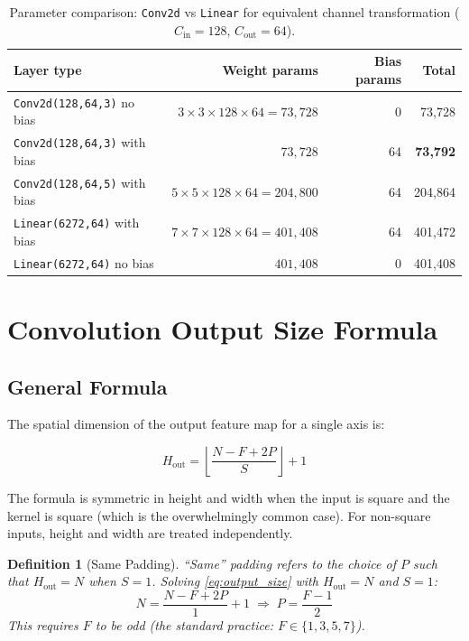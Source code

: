 \documentclass[12pt,a4paper]{article}
\newtheorem{definition}{Definition}[section]
\newcommand{\Cin}{C_{\mathrm{in}}}
\newcommand{\Cout}{C_{\mathrm{out}}}
\newcommand{\floor}[1]{\left\lfloor #1 \right\rfloor}
\begin{document}
\begin{table}[ht]
  \centering
  \caption{Parameter comparison: \texttt{Conv2d} vs \texttt{Linear} for
    equivalent channel transformation ($\Cin=128$, $\Cout=64$).}
  \label{tab:param_comparison}
  \begin{tabularx}{\linewidth}{@{}Xrrr@{}}
    \toprule
    Layer type & Weight params & Bias params & \textbf{Total} \\
    \midrule
    \texttt{Conv2d(128,64,3)} no bias
      & $3\!\times\!3\!\times\!128\!\times\!64 = 73{,}728$  & 0 & 73,728 \\
    \texttt{Conv2d(128,64,3)} with bias
      & $73{,}728$  & 64 & \textbf{73,792} \\
    \texttt{Conv2d(128,64,5)} with bias
      & $5\!\times\!5\!\times\!128\!\times\!64 = 204{,}800$ & 64 & 204,864 \\
    \texttt{Linear(6272,64)} with bias
      & $7\!\times\!7\!\times\!128\!\times\!64 = 401{,}408$ & 64 & 401,472 \\
    \texttt{Linear(6272,64)} no bias
      & $401{,}408$ & 0 & 401,408 \\
    \bottomrule
  \end{tabularx}
\end{table}

\section{Convolution Output Size Formula}
\label{sec:output_size}

\subsection{General Formula}

The spatial dimension of the output feature map for a single axis is:

\begin{equation}
  \label{eq:output_size}
  H_{\mathrm{out}} = \floor{\frac{N - F + 2P}{S}} + 1
\end{equation}

The formula is symmetric in height and width when the input is square and
the kernel is square (which is the overwhelmingly common case). For
non-square inputs, height and width are treated independently.

\begin{definition}[Same Padding]
\label{def:same_padding}
``Same'' padding refers to the choice of $P$ such that
$H_{\mathrm{out}} = N$ when $S = 1$. Solving
\cref{eq:output_size} with $H_{\mathrm{out}} = N$ and $S = 1$:
\[
  N = \frac{N - F + 2P}{1} + 1
  \;\Longrightarrow\;
  P = \frac{F - 1}{2}
\]
This requires $F$ to be odd (the standard practice: $F \in \{1, 3, 5, 7\}$).
\end{definition}
\end{document}
